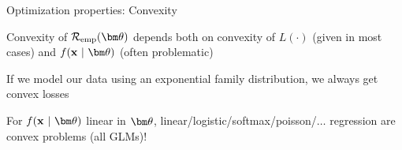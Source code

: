\documentclass[11pt,compress,t,notes=noshow, xcolor=table]{beamer}
\begin{document}

\begin{frame}{Optimization properties: Convexity}

\begin{itemizeL}
\item Convexity of $\risket$ depends both on convexity of $L(\cdot)$ (given in most cases) and $\fxt$ (often problematic)
\item If we model our data using an exponential family distribution, we always get convex losses 
\item For $\fxt$ linear in $\thetav$, linear/logistic/softmax/poisson/$\ldots$ regression are convex problems (all GLMs)! 
\end{itemizeL} 

\vfill

{
}%

\end{frame}

\end{document}
